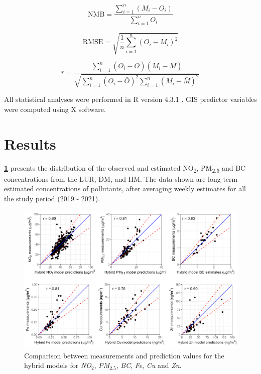 \documentclass{article}
\begin{document}
\begin{equation}
\text{NMB} = \frac{\sum_{i=1}^{n} (M_i - O_i)}{\sum_{i=1}^{n} O_i}
\end{equation}

\begin{equation}
\text{RMSE} = \sqrt{\frac{1}{n} \sum_{i=1}^{n} (O_i - M_i)^2}
\end{equation}

\begin{equation}
r = \frac{\sum_{i=1}^{n} (O_i - \bar{O})(M_i - \bar{M})}{\sqrt{\sum_{i=1}^{n} (O_i - \bar{O})^2 \sum_{i=1}^{n} (M_i - \bar{M})^2}}
\end{equation}
\vspace{0.5cm}

All statistical analyses were performed in R version 4.3.1 \cite{Rstudio}. GIS predictor variables were computed using X software. 



\newpage
\section{Results}

\textbf{\cref{fig2}} presents the distribution of the observed and estimated NO\textsubscript{2}, PM\textsubscript{2.5} and BC concentrations from the LUR, DM, and HM. The data shown are long-term estimated concentrations of pollutants, after averaging weekly estimates for all the study period (2019 - 2021).   


\captionsetup[figure]{skip=6pt}
\begin{figure}[!htb]
\includegraphics[width=1.0\textwidth]{figures/fig_HM_test_all_models.png}
\caption{Comparison between measurements and prediction values for the hybrid models for \textit{NO$_2$}, \textit{PM$_{2.5}$}, \textit{BC}, \textit{Fe}, \textit{Cu} and \textit{Zn}.}
\label{fig2}
\end{figure}
\end{document}
